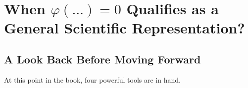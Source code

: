%
%
\startcontents[chapter]
\chapter{When \texorpdfstring{$\varphi(\ldots)=0$}{phi(pi)=0}
         Qualifies as a General Scientific Representation?}
\label{ch:universality_conditions}
\minitocboxed

\section*{A Look Back Before Moving Forward}

At this point in the book, four powerful tools are in hand.

